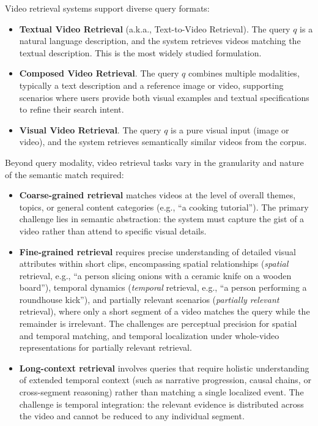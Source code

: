 Video retrieval systems support diverse query formats:
\begin{itemize}
    \item \textbf{Textual Video Retrieval} (a.k.a., Text-to-Video Retrieval). The query $q$ is a natural language description, and the system retrieves videos matching the textual description. This is the most widely studied formulation.
    \item \textbf{Composed Video Retrieval}. The query $q$ combines multiple modalities, typically a text description and a reference image or video, supporting scenarios where users provide both visual examples and textual specifications to refine their search intent.
    \item \textbf{Visual Video Retrieval}. The query $q$ is a pure visual input (image or video), and the system retrieves semantically similar videos from the corpus.
\end{itemize}

Beyond query modality, video retrieval tasks vary in the granularity and nature of the semantic match required:
\begin{itemize}
    \item \textbf{Coarse-grained retrieval} matches videos at the level of overall themes, topics, or general content categories (e.g., ``a cooking tutorial''). The primary challenge lies in semantic abstraction: the system must capture the gist of a video rather than attend to specific visual details.
    \item \textbf{Fine-grained retrieval} requires precise understanding of detailed visual attributes within short clips, encompassing spatial relationships (\textit{spatial} retrieval, e.g., ``a person slicing onions with a ceramic knife on a wooden board''), temporal dynamics (\textit{temporal} retrieval, e.g., ``a person performing a roundhouse kick''), and partially relevant scenarios (\textit{partially relevant} retrieval), where only a short segment of a video matches the query while the remainder is irrelevant. The challenges are perceptual precision for spatial and temporal matching, and temporal localization under whole-video representations for partially relevant retrieval.
    \item \textbf{Long-context retrieval} involves queries that require holistic understanding of extended temporal context (such as narrative progression, causal chains, or cross-segment reasoning) rather than matching a single localized event. The challenge is temporal integration: the relevant evidence is distributed across the video and cannot be reduced to any individual segment.
\end{itemize}

